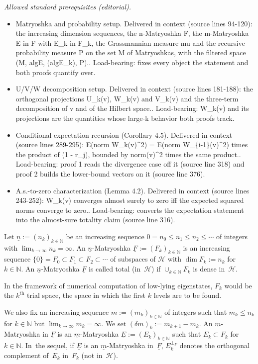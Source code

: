 \documentclass[10pt,a4paper]{article}
\newcommand{\hilH}{\mathcal H}
\newcommand{\kN}{k\in \mathbb{N}}
\newcommand{\perpF}{{\perp _F}}
\begin{document}
\noindent\textit{Allowed standard prerequisites (editorial).}\begin{itemize}
\item Matryoshka and probability setup. Delivered in context (source lines 94-120): the increasing dimension sequences, the n-Matryoshka F, the m-Matryoshka E in F with E\_k in F\_k, the Grassmannian measure mu and the recursive probability measure P on the set M of Matryoshkas, with the filtered space (M, algE, (algE\_k), P).. Load-bearing: fixes every object the statement and both proofs quantify over.
\item U/V/W decomposition setup. Delivered in context (source lines 181-188): the orthogonal projections U\_k(v), W\_k(v) and V\_k(v) and the three-term decomposition of v and of the Hilbert space.. Load-bearing: W\_k(v) and its projections are the quantities whose large-k behavior both proofs track.
\item Conditional-expectation recursion (Corollary 4.5). Delivered in context (source lines 289-295): E(norm W\_k(v)\textasciicircum{}2) = E(norm W\_\{i-1\}(v)\textasciicircum{}2) times the product of (1 - r\_j), bounded by norm(v)\textasciicircum{}2 times the same product.. Load-bearing: proof 1 reads the divergence case off it (source line 318) and proof 2 builds the lower-bound vectors on it (source line 376).
\item A.s.-to-zero characterization (Lemma 4.2). Delivered in context (source lines 243-252): W\_k(v) converges almost surely to zero iff the expected squared norms converge to zero.. Load-bearing: converts the expectation statement into the almost-sure totality claim (source line 316).
\end{itemize}\medskip
Let $\underline{n}:=(n_k)_{\kN}$ be an increasing sequence $0=n_0 \leq n_1\leq n_2\leq\cdots $ of integers with \mbox{$\lim_{k\to \infty}n_k=\infty$}.
An $\underline{n}$-Matryoshka $\underline{F}:=(F_k)_{\kN}$ is an increasing sequence $\{0\}=F_0\subset F_1\subset F_2\subset\cdots$ of subspaces of $\hilH$ with $\dim F_k:=n_k$ for $\kN$.
An $\underline{n}$-Matryoshka $\underline{F}$ is called total (in~$\hilH$) if $\cup_{\kN} F_k$ is dense in~$\hilH$.


In the framework of numerical computation of low-lying eigenstates, $F_k$ would be the $k^{\text{th}}$ trial space, the space in which the first $k$ levels are to be found.

We also fix an increasing sequence $\underline{m}:=(m_k)_{\kN}$ of integers such that $m_k\leq n_k$ for $\kN$ but $\lim_{k\to \infty}m_k=\infty$. We set $(\delta m)_k:=m_{k+1}-m_k$.
An $\underline{m}$-Matryoshka in $\underline{F}$ is an $\underline{m}$-Matryoshka $\underline{E}:=(E_k)_{\kN}$ such that $E_k \subset F_k$ for $\kN$. In~the sequel, if $\underline{E}$ is an $\underline{m}$-Matryoshka in~$\underline{F}$, $E_k^\perpF$ denotes the orthogonal complement of~$E_k$ in~$F_k$ (not in~$\hilH$).
\end{document}
